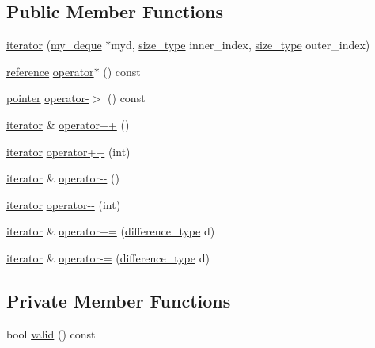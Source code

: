 \subsection*{Public Member Functions}
\begin{DoxyCompactItemize}
\item 
\hyperlink{classmy__deque_1_1iterator_af810e94f668ed8bf7fa5be5788c79099}{iterator} (\hyperlink{classmy__deque}{my\-\_\-deque} $\ast$myd, \hyperlink{classmy__deque_1_1iterator_a23ff400617b1c6b42ff3f67fb318d19d}{size\-\_\-type} inner\-\_\-index, \hyperlink{classmy__deque_1_1iterator_a23ff400617b1c6b42ff3f67fb318d19d}{size\-\_\-type} outer\-\_\-index)
\item 
\hyperlink{classmy__deque_1_1iterator_ae165ee997a9e18330c593789e9899e57}{reference} \hyperlink{classmy__deque_1_1iterator_a12632f02814bba64ca79f42edc0e1497}{operator$\ast$} () const 
\item 
\hyperlink{classmy__deque_1_1iterator_add0e1ed49072422b5aa0ef52303fb86e}{pointer} \hyperlink{classmy__deque_1_1iterator_a064f5b1faf5a72113083425133de9a41}{operator-\/$>$} () const 
\item 
\hyperlink{classmy__deque_1_1iterator}{iterator} \& \hyperlink{classmy__deque_1_1iterator_ab2a00619614e204eedb184112a56016e}{operator++} ()
\item 
\hyperlink{classmy__deque_1_1iterator}{iterator} \hyperlink{classmy__deque_1_1iterator_a57f6ac4aef7215ca67b6e05eeda29ee4}{operator++} (int)
\item 
\hyperlink{classmy__deque_1_1iterator}{iterator} \& \hyperlink{classmy__deque_1_1iterator_a278cab96c03498e55ba1aa4e05f1538e}{operator-\/-\/} ()
\item 
\hyperlink{classmy__deque_1_1iterator}{iterator} \hyperlink{classmy__deque_1_1iterator_a5bef4b6332aecf7dcda57cee9a1fdc70}{operator-\/-\/} (int)
\item 
\hyperlink{classmy__deque_1_1iterator}{iterator} \& \hyperlink{classmy__deque_1_1iterator_ad17b4f6e8be4d8242ad4572d62beff82}{operator+=} (\hyperlink{classmy__deque_1_1iterator_ac5f62e8566ad92478931c2abd9ac6596}{difference\-\_\-type} d)
\item 
\hyperlink{classmy__deque_1_1iterator}{iterator} \& \hyperlink{classmy__deque_1_1iterator_a13c056d48543734a23a9de09fd652868}{operator-\/=} (\hyperlink{classmy__deque_1_1iterator_ac5f62e8566ad92478931c2abd9ac6596}{difference\-\_\-type} d)
\end{DoxyCompactItemize}
\subsection*{Private Member Functions}
\begin{DoxyCompactItemize}
\item 
bool \hyperlink{classmy__deque_1_1iterator_a4e56b174bbf8c52c58e2f3934be7fc75}{valid} () const 
\end{DoxyCompactItemize}

